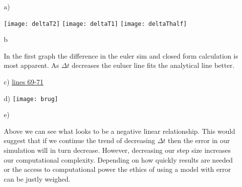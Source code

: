 \documentclass{report}
\begin{document}
\begin{itemize}
        \item[a)]{
                \begin{center}
                        \texttt{[image: deltaT2]}
                        \texttt{[image: deltaT1]}
                        \texttt{[image: deltaThalf]}
                \end{center}
                
        }
        \item[b]{
                \begin{sol}
                      In the first graph the difference in the euler sim and closed form calculation is most apparent. As $\Delta t$ decreases the euluer line fits the analytical line better. 
                \end{sol}
        }
\item[c)]{\sol \href{https://github.com/TaiskeColclasure/csci4830_colclasure/blob/main/hw2/FowardEulerSim2.py}{lines 69-71}}
        \item[d)]{
                \texttt{[image: brug]}\\
        }
        \item[e)]{

                \begin{sol}
                        Above we can see what looks to be a negative linear relationship. This  would suggest that if we continue the trend of decreasing $\Delta t$ then the error in our simulation will in turn decrease. However, decreasing our step size increases our computational complexity. Depending on how quickly results are needed or the access to computational power the ethics of using a model with error can be justly weighed.
                \end{sol}
        }
\end{itemize}
\newpage
\end{document}
